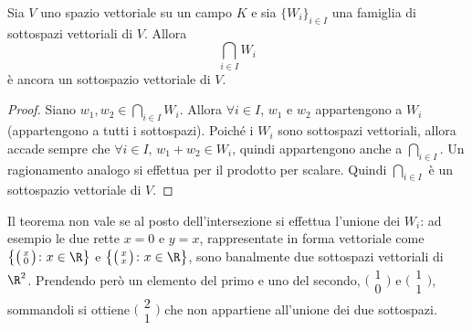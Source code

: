 \begin{teorema} \label{t:intersezione-sottospazi}
	Sia $V$ uno spazio vettoriale su un campo $K$ e sia $\{W_i\}_{i\in I}$ una famiglia di sottospazi vettoriali di $V$.
	Allora
	\begin{equation*}
		\bigcap_{i\in I}W_i
	\end{equation*}
	è ancora un sottospazio vettoriale di $V$.
\end{teorema}
\begin{proof}
	Siano $  w_1,  w_2\in\bigcap_{i\in I}W_i$.
	Allora $\forall i\in I$, $  w_1$ e $  w_2$ appartengono a $W_i$ (appartengono a tutti i sottospazi).
	Poiché i $W_i$ sono sottospazi vettoriali, allora accade sempre che $\forall i\in I$, $  w_1+  w_2\in W_i$, quindi appartengono anche a $\bigcap_{i\in I}$.
	Un ragionamento analogo si effettua per il prodotto per scalare.
	Quindi $\bigcap_{i\in I}$ è un sottospazio vettoriale di $V$.
\end{proof}
Il teorema non vale se al posto dell'intersezione si effettua l'unione dei $W_i$: ad esempio le due rette $x=0$ e $y=x$, rappresentate in forma vettoriale come $\big\{\big(\begin{smallmatrix} x\\0 \end{smallmatrix}\big)\colon x\in\R\big\}$ e $\big\{\big(\begin{smallmatrix} x\\x \end{smallmatrix}\big)\colon x\in\R\big\}$, sono banalmente due sottospazi vettoriali di $\R^2$.
Prendendo però un elemento del primo e uno del secondo, $\big(\begin{smallmatrix} 1\\0 \end{smallmatrix}\big)$ e $\big(\begin{smallmatrix} 1\\1 \end{smallmatrix}\big)$, sommandoli si ottiene $\big(\begin{smallmatrix} 2\\1 \end{smallmatrix}\big)$ che non appartiene all'unione dei due sottospazi.

